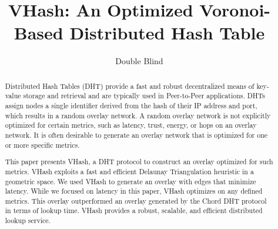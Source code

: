 \documentclass{IEEEtran}
\title{VHash: An Optimized Voronoi-Based Distributed Hash Table }
\author{Double Blind}
\date{} %
\begin{document}
\maketitle

\begin{abstract}
Distributed Hash Tables (DHT) provide a fast and robust decentralized means of key-value storage and retrieval and are typically used in Peer-to-Peer applications.
DHTs assign nodes a single identifier derived from the hash of their IP address and port, which results in a random overlay network.   
A random overlay network is not explicitly optimized for certain metrics, such as latency, trust, energy, or hops on an overlay network.  It is often desirable to generate an overlay network that is optimized for one or more specific metrics.

This paper presents VHash, a DHT protocol to construct an overlay optimized for such metrics. 
VHash exploits a fast and efficient Delaunay Triangulation heuristic in a geometric space. 
We used VHash to generate an overlay with edges that minimize latency. 
While we focused on latency in this paper, VHash optimizes on any defined metrics.
This overlay outperformed an overlay generated by the Chord DHT protocol in terms of lookup time.
VHash provides a robust, scalable, and efficient distributed lookup service.

\end{abstract}
\end{document}
